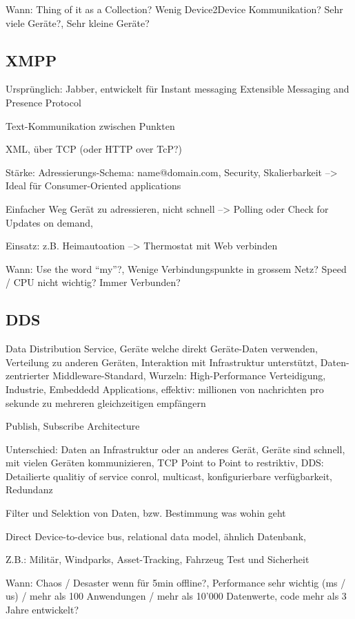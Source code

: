 Wann: Thing of it as a Collection?  Wenig Device2Device Kommunikation? Sehr viele Geräte?, Sehr kleine Geräte? 

\subsection{XMPP}
Ursprünglich: Jabber, entwickelt für Instant messaging
Extensible Messaging and Presence Protocol

Text-Kommunikation zwischen Punkten

XML, über TCP (oder HTTP over TcP?)

Stärke: Adressierungs-Schema: name@domain.com, Security, Skalierbarkeit 
--> Ideal für Consumer-Oriented applications

Einfacher Weg Gerät zu adressieren, nicht schnell --> Polling oder Check for Updates on demand, 

Einsatz: z.B. Heimautoation --> Thermostat mit Web verbinden

Wann: Use the word "`my"'?, Wenige Verbindungspunkte in grossem Netz? Speed / CPU nicht wichtig? Immer Verbunden?

\subsection{DDS}
Data Distribution Service, Geräte welche direkt Geräte-Daten verwenden, Verteilung zu anderen Geräten, Interaktion mit Infrastruktur unterstützt, Daten-zentrierter Middleware-Standard, Wurzeln: High-Performance Verteidigung, Industrie, Embeddedd Applications, effektiv: millionen von nachrichten pro sekunde zu mehreren gleichzeitigen empfängern


Publish, Subscribe Architecture

Unterschied: Daten an Infrastruktur oder an anderes Gerät, Geräte sind schnell, mit vielen Geräten kommunizieren, TCP Point to Point to restriktiv, DDS: Detailierte qualitiy of service conrol, multicast, konfigurierbare verfügbarkeit, Redundanz

Filter und Selektion von Daten, bzw. Bestimmung was wohin geht

Direct Device-to-device bus, relational data model, ähnlich Datenbank, 

Z.B.: Militär, Windparks, Asset-Tracking, Fahrzeug Test und Sicherheit


Wann: Chaos / Desaster wenn für 5min offline?, Performance sehr wichtig (ms / us) / mehr als 100 Anwendungen / mehr als 10'000 Datenwerte, code mehr als 3 Jahre entwickelt?
